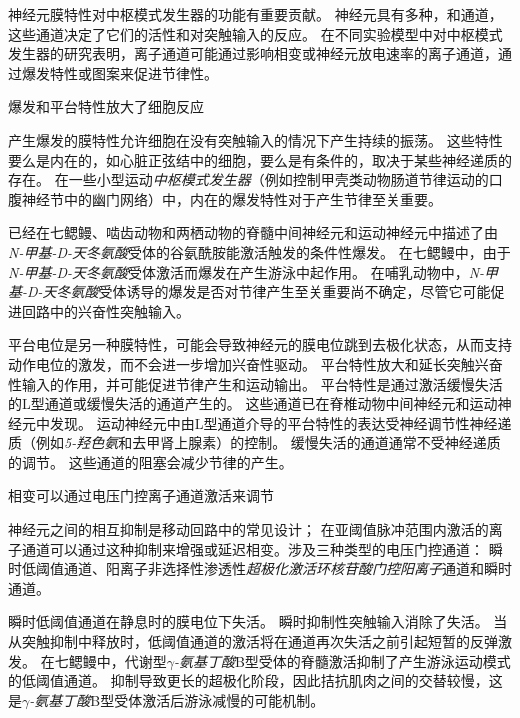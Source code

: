 \begin{proposition}[神经元离子通道有助于中枢模式发生器功能] \label{box:33_2}
	
	\quad \quad 神经元膜特性对中枢模式发生器的功能有重要贡献。
	神经元具有多种，和通道，这些通道决定了它们的活性和对突触输入的反应。
	在不同实验模型中对中枢模式发生器的研究表明，离子通道可能通过影响相变或神经元放电速率的离子通道，通过爆发特性或图案来促进节律性。
	
	\quad \quad 爆发和平台特性放大了细胞反应
	
	\quad \quad 产生爆发的膜特性允许细胞在没有突触输入的情况下产生持续的振荡。
	这些特性要么是内在的，如心脏正弦结中的细胞，要么是有条件的，取决于某些神经递质的存在。
	在一些小型运动\textit{中枢模式发生器}（例如控制甲壳类动物肠道节律运动的口腹神经节中的幽门网络）中，内在的爆发特性对于产生节律至关重要。
	
	\quad \quad 已经在七鳃鳗、啮齿动物和两栖动物的脊髓中间神经元和运动神经元中描述了由\textit{N-甲基-D-天冬氨酸}受体的谷氨酰胺能激活触发的条件性爆发。
	在七鳃鳗中，由于\textit{N-甲基-D-天冬氨酸}受体激活而爆发在产生游泳中起作用。
	在哺乳动物中，\textit{N-甲基-D-天冬氨酸}受体诱导的爆发是否对节律产生至关重要尚不确定，尽管它可能促进回路中的兴奋性突触输入。
	
	\quad \quad 平台电位是另一种膜特性，可能会导致神经元的膜电位跳到去极化状态，从而支持动作电位的激发，而不会进一步增加兴奋性驱动。
	平台特性放大和延长突触兴奋性输入的作用，并可能促进节律产生和运动输出。
	平台特性是通过激活缓慢失活的L型通道或缓慢失活的通道产生的。
	这些通道已在脊椎动物中间神经元和运动神经元中发现。
	运动神经元中由L型通道介导的平台特性的表达受神经调节性神经递质（例如\textit{5-羟色氨}和去甲肾上腺素）的控制。
	缓慢失活的通道通常不受神经递质的调节。
	这些通道的阻塞会减少节律的产生。
	
	\quad \quad 相变可以通过电压门控离子通道激活来调节
	
	\quad \quad 神经元之间的相互抑制是移动回路中的常见设计；
	在亚阈值脉冲范围内激活的离子通道可以通过这种抑制来增强或延迟相变。涉及三种类型的电压门控通道：
	瞬时低阈值通道、阳离子非选择性渗透性\textit{超极化激活环核苷酸门控阳离子}通道和瞬时通道。
	
	\quad \quad 瞬时低阈值通道在静息时的膜电位下失活。
	瞬时抑制性突触输入消除了失活。
	当从突触抑制中释放时，低阈值通道的激活将在通道再次失活之前引起短暂的反弹激发。
	在七鳃鳗中，代谢型\textit{$\gamma$-氨基丁酸}B型受体的脊髓激活抑制了产生游泳运动模式的低阈值通道。
	抑制导致更长的超极化阶段，因此拮抗肌肉之间的交替较慢，这是\textit{$\gamma$-氨基丁酸}B型受体激活后游泳减慢的可能机制。
	

\end{proposition}
